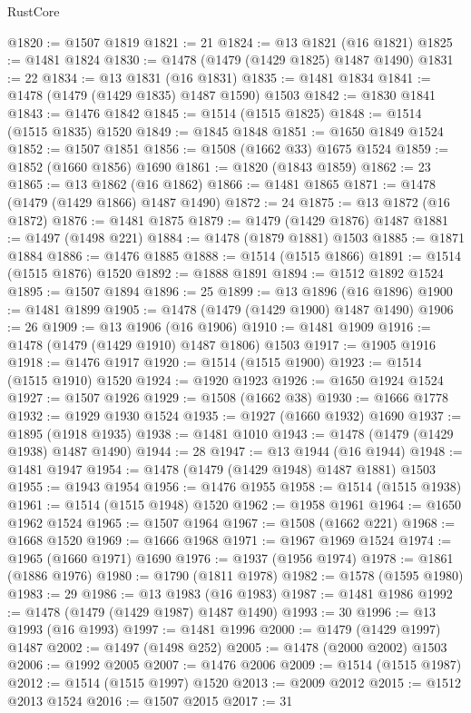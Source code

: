 \begin{lexlean}{RustCore}
\begin{coremodule}
@1820 := @1507 @1819
@1821 := 21
@1824 := @13 @1821 (@16 @1821)
@1825 := @1481 @1824
@1830 := @1478 (@1479 (@1429 @1825) @1487 @1490)
@1831 := 22
@1834 := @13 @1831 (@16 @1831)
@1835 := @1481 @1834
@1841 := @1478 (@1479 (@1429 @1835) @1487 @1590) @1503
@1842 := @1830 @1841
@1843 := @1476 @1842
@1845 := @1514 (@1515 @1825)
@1848 := @1514 (@1515 @1835) @1520
@1849 := @1845 @1848
@1851 := @1650 @1849 @1524
@1852 := @1507 @1851
@1856 := @1508 (@1662 @33) @1675 @1524
@1859 := @1852 (@1660 @1856) @1690
@1861 := @1820 (@1843 @1859)
@1862 := 23
@1865 := @13 @1862 (@16 @1862)
@1866 := @1481 @1865
@1871 := @1478 (@1479 (@1429 @1866) @1487 @1490)
@1872 := 24
@1875 := @13 @1872 (@16 @1872)
@1876 := @1481 @1875
@1879 := @1479 (@1429 @1876) @1487
@1881 := @1497 (@1498 @221)
@1884 := @1478 (@1879 @1881) @1503
@1885 := @1871 @1884
@1886 := @1476 @1885
@1888 := @1514 (@1515 @1866)
@1891 := @1514 (@1515 @1876) @1520
@1892 := @1888 @1891
@1894 := @1512 @1892 @1524
@1895 := @1507 @1894
@1896 := 25
@1899 := @13 @1896 (@16 @1896)
@1900 := @1481 @1899
@1905 := @1478 (@1479 (@1429 @1900) @1487 @1490)
@1906 := 26
@1909 := @13 @1906 (@16 @1906)
@1910 := @1481 @1909
@1916 := @1478 (@1479 (@1429 @1910) @1487 @1806) @1503
@1917 := @1905 @1916
@1918 := @1476 @1917
@1920 := @1514 (@1515 @1900)
@1923 := @1514 (@1515 @1910) @1520
@1924 := @1920 @1923
@1926 := @1650 @1924 @1524
@1927 := @1507 @1926
@1929 := @1508 (@1662 @38)
@1930 := @1666 @1778
@1932 := @1929 @1930 @1524
@1935 := @1927 (@1660 @1932) @1690
@1937 := @1895 (@1918 @1935)
@1938 := @1481 @1010
@1943 := @1478 (@1479 (@1429 @1938) @1487 @1490)
@1944 := 28
@1947 := @13 @1944 (@16 @1944)
@1948 := @1481 @1947
@1954 := @1478 (@1479 (@1429 @1948) @1487 @1881) @1503
@1955 := @1943 @1954
@1956 := @1476 @1955
@1958 := @1514 (@1515 @1938)
@1961 := @1514 (@1515 @1948) @1520
@1962 := @1958 @1961
@1964 := @1650 @1962 @1524
@1965 := @1507 @1964
@1967 := @1508 (@1662 @221)
@1968 := @1668 @1520
@1969 := @1666 @1968
@1971 := @1967 @1969 @1524
@1974 := @1965 (@1660 @1971) @1690
@1976 := @1937 (@1956 @1974)
@1978 := @1861 (@1886 @1976)
@1980 := @1790 (@1811 @1978)
@1982 := @1578 (@1595 @1980)
@1983 := 29
@1986 := @13 @1983 (@16 @1983)
@1987 := @1481 @1986
@1992 := @1478 (@1479 (@1429 @1987) @1487 @1490)
@1993 := 30
@1996 := @13 @1993 (@16 @1993)
@1997 := @1481 @1996
@2000 := @1479 (@1429 @1997) @1487
@2002 := @1497 (@1498 @252)
@2005 := @1478 (@2000 @2002) @1503
@2006 := @1992 @2005
@2007 := @1476 @2006
@2009 := @1514 (@1515 @1987)
@2012 := @1514 (@1515 @1997) @1520
@2013 := @2009 @2012
@2015 := @1512 @2013 @1524
@2016 := @1507 @2015
@2017 := 31

\end{coremodule}
\end{lexlean}
